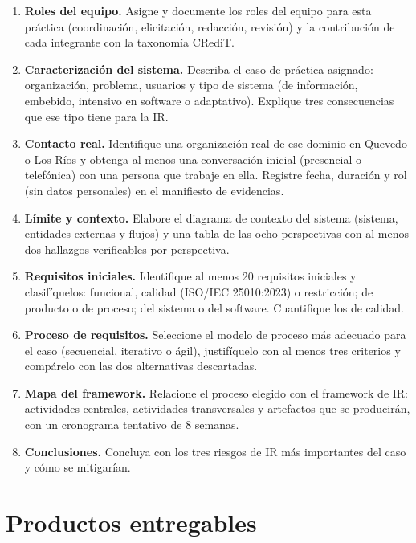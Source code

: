 \documentclass[11pt]{article}
\newcommand{\seccion}[1]{\section{\textcolor{utegreendk}{#1}}}
\begin{document}
\begin{enumerate}[leftmargin=20pt,itemsep=4pt]
	\item \textbf{Roles del equipo.} Asigne y documente los roles del equipo para esta práctica (coordinación, elicitación, redacción, revisión) y la contribución de cada integrante con la taxonomía CRediT.
	\item \textbf{Caracterización del sistema.} Describa el caso de práctica asignado: organización, problema, usuarios y tipo de sistema (de información, embebido, intensivo en software o adaptativo). Explique tres consecuencias que ese tipo tiene para la IR.
	\item \textbf{Contacto real.} Identifique una organización real de ese dominio en Quevedo o Los Ríos y obtenga al menos una conversación inicial (presencial o telefónica) con una persona que trabaje en ella. Registre fecha, duración y rol (sin datos personales) en el manifiesto de evidencias.
	\item \textbf{Límite y contexto.} Elabore el diagrama de contexto del sistema (sistema, entidades externas y flujos) y una tabla de las ocho perspectivas con al menos dos hallazgos verificables por perspectiva.
	\item \textbf{Requisitos iniciales.} Identifique al menos 20 requisitos iniciales y clasifíquelos: funcional, calidad (ISO/\allowbreak{}IEC 25010:2023) o restricción; de producto o de proceso; del sistema o del software. Cuantifique los de calidad.
	\item \textbf{Proceso de requisitos.} Seleccione el modelo de proceso más adecuado para el caso (secuencial, iterativo o ágil), justifíquelo con al menos tres criterios y compárelo con las dos alternativas descartadas.
	\item \textbf{Mapa del framework.} Relacione el proceso elegido con el framework de IR: actividades centrales, actividades transversales y artefactos que se producirán, con un cronograma tentativo de 8 semanas.
	\item \textbf{Conclusiones.} Concluya con los tres riesgos de IR más importantes del caso y cómo se mitigarían.
\end{enumerate}

\seccion{Productos entregables}
\end{document}
